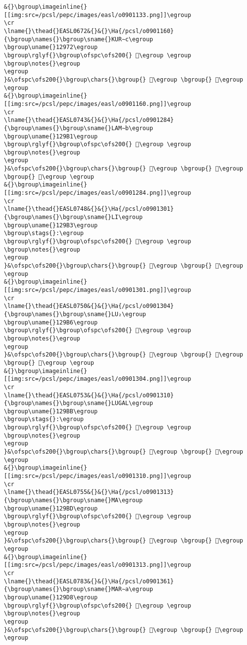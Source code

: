 \begin{verbatim}
&{}\bgroup\imageinline{}[[img:src=/pcsl/pepc/images/easl/o0901133.png]]\egroup
\cr
\lname{}\thead{}EASL0672&{}&{}\Ha{/pcsl/o0901160}{\bgroup\names{}\bgroup\sname{}KUR∼c\egroup
\bgroup\uname{}12972\egroup
\bgroup\rglyf{}\bgroup\ofspc\ofs200{} 𒥲\egroup \egroup
\bgroup\notes{}\egroup
\egroup
}&\ofspc\ofs200{}\bgroup\chars{}\bgroup{} 𒥱\egroup \bgroup{} 𒥲\egroup \egroup
&{}\bgroup\imageinline{}[[img:src=/pcsl/pepc/images/easl/o0901160.png]]\egroup
\cr
\lname{}\thead{}EASL0743&{}&{}\Ha{/pcsl/o0901284}{\bgroup\names{}\bgroup\sname{}LAM∼b\egroup
\bgroup\uname{}129B1\egroup
\bgroup\rglyf{}\bgroup\ofspc\ofs200{} 𒦱\egroup \egroup
\bgroup\notes{}\egroup
\egroup
}&\ofspc\ofs200{}\bgroup\chars{}\bgroup{} 𒦭\egroup \bgroup{} 𒦱\egroup \bgroup{} 𒦲\egroup \egroup
&{}\bgroup\imageinline{}[[img:src=/pcsl/pepc/images/easl/o0901284.png]]\egroup
\cr
\lname{}\thead{}EASL0748&{}&{}\Ha{/pcsl/o0901301}{\bgroup\names{}\bgroup\sname{}LI\egroup
\bgroup\uname{}129B3\egroup
\bgroup\stags{}:\egroup
\bgroup\rglyf{}\bgroup\ofspc\ofs200{} 𒦳\egroup \egroup
\bgroup\notes{}\egroup
\egroup
}&\ofspc\ofs200{}\bgroup\chars{}\bgroup{} 𒦳\egroup \bgroup{} 𒦴\egroup \egroup
&{}\bgroup\imageinline{}[[img:src=/pcsl/pepc/images/easl/o0901301.png]]\egroup
\cr
\lname{}\thead{}EASL0750&{}&{}\Ha{/pcsl/o0901304}{\bgroup\names{}\bgroup\sname{}LU₂\egroup
\bgroup\uname{}129B6\egroup
\bgroup\rglyf{}\bgroup\ofspc\ofs200{} 𒦶\egroup \egroup
\bgroup\notes{}\egroup
\egroup
}&\ofspc\ofs200{}\bgroup\chars{}\bgroup{} 𒦹\egroup \bgroup{} 𒦶\egroup \bgroup{} 𒦸\egroup \egroup
&{}\bgroup\imageinline{}[[img:src=/pcsl/pepc/images/easl/o0901304.png]]\egroup
\cr
\lname{}\thead{}EASL0753&{}&{}\Ha{/pcsl/o0901310}{\bgroup\names{}\bgroup\sname{}LUGAL\egroup
\bgroup\uname{}129BB\egroup
\bgroup\stags{}:\egroup
\bgroup\rglyf{}\bgroup\ofspc\ofs200{} 𒦻\egroup \egroup
\bgroup\notes{}\egroup
\egroup
}&\ofspc\ofs200{}\bgroup\chars{}\bgroup{} 𒦺\egroup \bgroup{} 𒦻\egroup \egroup
&{}\bgroup\imageinline{}[[img:src=/pcsl/pepc/images/easl/o0901310.png]]\egroup
\cr
\lname{}\thead{}EASL0755&{}&{}\Ha{/pcsl/o0901313}{\bgroup\names{}\bgroup\sname{}MA\egroup
\bgroup\uname{}129BD\egroup
\bgroup\rglyf{}\bgroup\ofspc\ofs200{} 𒦽\egroup \egroup
\bgroup\notes{}\egroup
\egroup
}&\ofspc\ofs200{}\bgroup\chars{}\bgroup{} 𒦽\egroup \bgroup{} 𒧀\egroup \egroup
&{}\bgroup\imageinline{}[[img:src=/pcsl/pepc/images/easl/o0901313.png]]\egroup
\cr
\lname{}\thead{}EASL0783&{}&{}\Ha{/pcsl/o0901361}{\bgroup\names{}\bgroup\sname{}MAR∼a\egroup
\bgroup\uname{}129D8\egroup
\bgroup\rglyf{}\bgroup\ofspc\ofs200{} 𒧘\egroup \egroup
\bgroup\notes{}\egroup
\egroup
}&\ofspc\ofs200{}\bgroup\chars{}\bgroup{} 𒧘\egroup \bgroup{} 𒧚\egroup \egroup

\end{verbatim}
